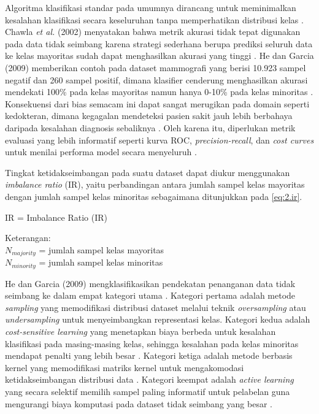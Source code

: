 Algoritma klasifikasi standar pada umumnya dirancang untuk meminimalkan kesalahan klasifikasi secara keseluruhan tanpa memperhatikan distribusi kelas \cite{Chawla2002SMOTE}. Chawla \textit{et al.} (2002) menyatakan bahwa metrik akurasi tidak tepat digunakan pada data tidak seimbang karena strategi sederhana berupa prediksi seluruh data ke kelas mayoritas sudah dapat menghasilkan akurasi yang tinggi \cite{Chawla2002SMOTE}. He dan Garcia (2009) memberikan contoh pada dataset mammografi yang berisi 10.923 sampel negatif dan 260 sampel positif, dimana klasifier cenderung menghasilkan akurasi mendekati 100\% pada kelas mayoritas namun hanya 0-10\% pada kelas minoritas \cite{He2009Imbalanced}. Konsekuensi dari bias semacam ini dapat sangat merugikan pada domain seperti kedokteran, dimana kegagalan mendeteksi pasien sakit jauh lebih berbahaya daripada kesalahan diagnosis sebaliknya \cite{He2009Imbalanced}. Oleh karena itu, diperlukan metrik evaluasi yang lebih informatif seperti kurva ROC, \textit{precision-recall}, dan \textit{cost curves} untuk menilai performa model secara menyeluruh \cite{He2009Imbalanced, Fawcett2006ROC}.

Tingkat ketidakseimbangan pada suatu dataset dapat diukur menggunakan \textit{imbalance ratio} (IR), yaitu perbandingan antara jumlah sampel kelas mayoritas dengan jumlah sampel kelas minoritas sebagaimana ditunjukkan pada \ref{eq:2.ir}.

\begin{equationcaptioned}[eq:2.ir]{
    IR = 
}{
    Imbalance Ratio (IR)
}
\end{equationcaptioned}

Keterangan: \\
$N_{majority}$ = jumlah sampel kelas mayoritas \\
$N_{minority}$ = jumlah sampel kelas minoritas

He dan Garcia (2009) mengklasifikasikan pendekatan penanganan data tidak seimbang ke dalam empat kategori utama \cite{He2009Imbalanced}. Kategori pertama adalah metode \textit{sampling} yang memodifikasi distribusi dataset melalui teknik \textit{oversampling} atau \textit{undersampling} untuk menyeimbangkan representasi kelas. Kategori kedua adalah \textit{cost-sensitive learning} yang menetapkan biaya berbeda untuk kesalahan klasifikasi pada masing-masing kelas, sehingga kesalahan pada kelas minoritas mendapat penalti yang lebih besar \cite{He2009Imbalanced}. Kategori ketiga adalah metode berbasis kernel yang memodifikasi matriks kernel untuk mengakomodasi ketidakseimbangan distribusi data \cite{He2009Imbalanced}. Kategori keempat adalah \textit{active learning} yang secara selektif memilih sampel paling informatif untuk pelabelan guna mengurangi biaya komputasi pada dataset tidak seimbang yang besar \cite{He2009Imbalanced}.


